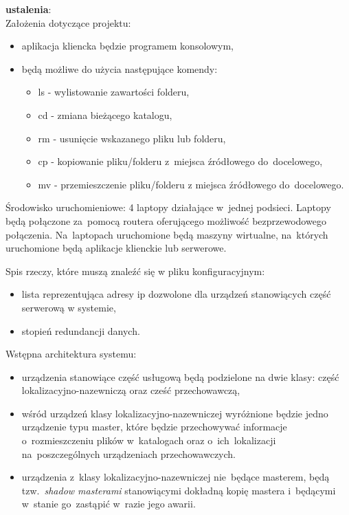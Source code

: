 \vspace{5mm}
\noindent
\textbf{ustalenia}: \\
Założenia dotyczące projektu:
\begin{itemize}
	\item aplikacja kliencka będzie programem konsolowym,
	\item będą możliwe do użycia następujące komendy:
	\begin{itemize}
		\item ls - wylistowanie zawartości folderu,
		\item cd - zmiana bieżącego katalogu,
		\item rm - usunięcie wskazanego pliku lub folderu,
		\item cp - kopiowanie pliku/folderu z~miejsca źródłowego do~docelowego,
		\item mv - przemieszczenie pliku/folderu z miejsca źródłowego do~docelowego.
   \end{itemize}
\end{itemize}

\vspace{5mm}
Środowisko uruchomieniowe: 4 laptopy działające w~jednej podsieci. 
Laptopy będą połączone za~pomocą routera oferującego możliwość
bezprzewodowego połączenia. Na~laptopach uruchomione będą maszyny wirtualne,
na~których uruchomione będą aplikacje klienckie lub serwerowe.

\vspace{5mm}
\noindent
Spis rzeczy, które muszą znaleźć się w pliku konfiguracyjnym:
\begin{itemize}
  \item lista reprezentująca adresy ip dozwolone dla urządzeń stanowiących
  część serwerową w systemie,
  \item stopień redundancji danych.
\end{itemize}

\vspace{5mm}
\noindent
Wstępna architektura systemu:
\begin{itemize}
  \item urządzenia stanowiące część usługową będą podzielone na dwie klasy:
część lokalizacyjno-nazewniczą oraz cześć przechowawczą,
  \item wśród urządzeń klasy lokalizacyjno-nazewniczej wyróżnione będzie jedno
  urządzenie typu master, które będzie przechowywać informacje o~rozmieszczeniu
  plików w~katalogach oraz o~ich~lokalizacji na~poszczególnych urządzeniach
  przechowawczych.
  \item urządzenia z~klasy lokalizacyjno-nazewniczej nie~będące masterem, będą
  tzw.~\emph{shadow masterami} stanowiącymi dokładną kopię mastera i~będącymi 
  w~stanie go~zastąpić w~razie jego awarii.
\end{itemize}

